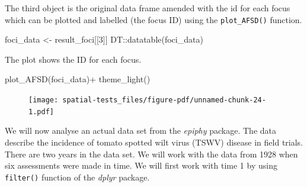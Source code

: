 \documentclass[
  letterpaper,
]{book}
\newenvironment{Shaded}{\begin{snugshade}}{\end{snugshade}}
\newcommand{\CommentTok}[1]{\textcolor[rgb]{0.37,0.37,0.37}{#1}}
\newcommand{\DecValTok}[1]{\textcolor[rgb]{0.68,0.00,0.00}{#1}}
\newcommand{\FunctionTok}[1]{\textcolor[rgb]{0.28,0.35,0.67}{#1}}
\newcommand{\NormalTok}[1]{\textcolor[rgb]{0.00,0.23,0.31}{#1}}
\newcommand{\OtherTok}[1]{\textcolor[rgb]{0.00,0.23,0.31}{#1}}
\newcommand{\SpecialCharTok}[1]{\textcolor[rgb]{0.37,0.37,0.37}{#1}}
\begin{document}
The third object is the original data frame amended with the id for each
focus which can be plotted and labelled (the focus ID) using the
\texttt{plot\_AFSD()} function.

\begin{Shaded}
\begin{Highlighting}[]
\NormalTok{foci\_data }\OtherTok{\textless{}{-}}\NormalTok{ result\_foci[[}\DecValTok{3}\NormalTok{]]}
\NormalTok{DT}\SpecialCharTok{::}\FunctionTok{datatable}\NormalTok{(foci\_data)}
\end{Highlighting}
\end{Shaded}

The plot shows the ID for each focus.

\begin{Shaded}
\begin{Highlighting}[]
\FunctionTok{plot\_AFSD}\NormalTok{(foci\_data)}\SpecialCharTok{+}
  \FunctionTok{theme\_light}\NormalTok{()}
\end{Highlighting}
\end{Shaded}

\begin{figure}[H]

\texttt{[image: spatial-tests\_files/figure-pdf/unnamed-chunk-24-1.pdf]} \hfill{}

\end{figure}

We will now analyse an actual data set from the \emph{epiphy} package.
The data describe the incidence of tomato spotted wilt virus (TSWV)
disease in field trials. There are two years in the data set. We will
work with the data from 1928 when six assessments were made in time. We
will first work with time 1 by using \texttt{filter()} function of the
\emph{dplyr} package.

\begin{Shaded}
\end{Shaded}
\end{document}

